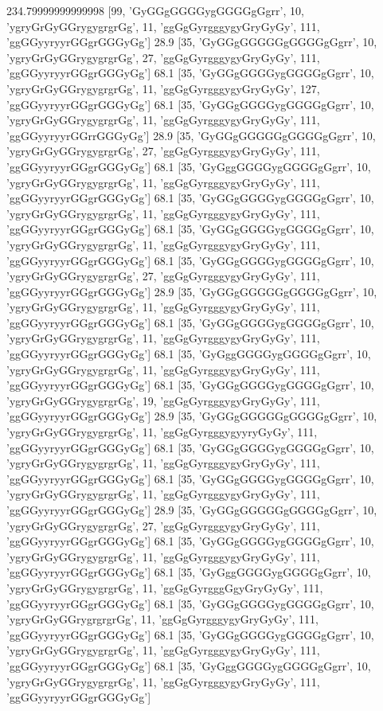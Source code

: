 234.79999999999998 [99, 'GyGGgGGGGygGGGGgGgrr', 10, 'ygryGrGyGGrygygrgrGg', 11, 'ggGgGyrgggygyGryGyGy', 111, 'ggGGyyryyrGGgrGGGyGg']
28.9 [35, 'GyGGgGGGGGgGGGGgGgrr', 10, 'ygryGrGyGGrygygrgrGg', 27, 'ggGgGyrgggygyGryGyGy', 111, 'ggGGyyryyrGGgrGGGyGg']
68.1 [35, 'GyGGgGGGGygGGGGgGgrr', 10, 'ygryGrGyGGrygygrgrGg', 11, 'ggGgGyrgggygyGryGyGy', 127, 'ggGGyyryyrGGgrGGGyGg']
68.1 [35, 'GyGGgGGGGygGGGGgGgrr', 10, 'ygryGrGyGGrygygrgrGg', 11, 'ggGgGyrgggygyGryGyGy', 111, 'ggGGyyryyrGGrrGGGyGg']
28.9 [35, 'GyGGgGGGGGgGGGGgGgrr', 10, 'ygryGrGyGGrygygrgrGg', 27, 'ggGgGyrgggygyGryGyGy', 111, 'ggGGyyryyrGGgrGGGyGg']
68.1 [35, 'GyGggGGGGygGGGGgGgrr', 10, 'ygryGrGyGGrygygrgrGg', 11, 'ggGgGyrgggygyGryGyGy', 111, 'ggGGyyryyrGGgrGGGyGg']
68.1 [35, 'GyGGgGGGGygGGGGgGgrr', 10, 'ygryGrGyGGrygygrgrGg', 11, 'ggGgGyrgggygyGryGyGy', 111, 'ggGGyyryyrGGgrGGGyGg']
68.1 [35, 'GyGGgGGGGygGGGGgGgrr', 10, 'ygryGrGyGGrygygrgrGg', 11, 'ggGgGyrgggygyGryGyGy', 111, 'ggGGyyryyrGGgrGGGyGg']
68.1 [35, 'GyGGgGGGGygGGGGgGgrr', 10, 'ygryGrGyGGrygygrgrGg', 27, 'ggGgGyrgggygyGryGyGy', 111, 'ggGGyyryyrGGgrGGGyGg']
28.9 [35, 'GyGGgGGGGGgGGGGgGgrr', 10, 'ygryGrGyGGrygygrgrGg', 11, 'ggGgGyrgggygyGryGyGy', 111, 'ggGGyyryyrGGgrGGGyGg']
68.1 [35, 'GyGGgGGGGygGGGGgGgrr', 10, 'ygryGrGyGGrygygrgrGg', 11, 'ggGgGyrgggygyGryGyGy', 111, 'ggGGyyryyrGGgrGGGyGg']
68.1 [35, 'GyGggGGGGygGGGGgGgrr', 10, 'ygryGrGyGGrygygrgrGg', 11, 'ggGgGyrgggygyGryGyGy', 111, 'ggGGyyryyrGGgrGGGyGg']
68.1 [35, 'GyGGgGGGGygGGGGgGgrr', 10, 'ygryGrGyGGrygygrgrGg', 19, 'ggGgGyrgggygyGryGyGy', 111, 'ggGGyyryyrGGgrGGGyGg']
28.9 [35, 'GyGGgGGGGGgGGGGgGgrr', 10, 'ygryGrGyGGrygygrgrGg', 11, 'ggGgGyrgggygyyryGyGy', 111, 'ggGGyyryyrGGgrGGGyGg']
68.1 [35, 'GyGGgGGGGygGGGGgGgrr', 10, 'ygryGrGyGGrygygrgrGg', 11, 'ggGgGyrgggygyGryGyGy', 111, 'ggGGyyryyrGGgrGGGyGg']
68.1 [35, 'GyGGgGGGGygGGGGgGgrr', 10, 'ygryGrGyGGrygygrgrGg', 11, 'ggGgGyrgggygyGryGyGy', 111, 'ggGGyyryyrGGgrGGGyGg']
28.9 [35, 'GyGGgGGGGGgGGGGgGgrr', 10, 'ygryGrGyGGrygygrgrGg', 27, 'ggGgGyrgggygyGryGyGy', 111, 'ggGGyyryyrGGgrGGGyGg']
68.1 [35, 'GyGGgGGGGygGGGGgGgrr', 10, 'ygryGrGyGGrygygrgrGg', 11, 'ggGgGyrgggygyGryGyGy', 111, 'ggGGyyryyrGGgrGGGyGg']
68.1 [35, 'GyGggGGGGygGGGGgGgrr', 10, 'ygryGrGyGGrygygrgrGg', 11, 'ggGgGyrgggGgyGryGyGy', 111, 'ggGGyyryyrGGgrGGGyGg']
68.1 [35, 'GyGGgGGGGygGGGGgGgrr', 10, 'ygryGrGyGGrygrgrgrGg', 11, 'ggGgGyrgggygyGryGyGy', 111, 'ggGGyyryyrGGgrGGGyGg']
68.1 [35, 'GyGGgGGGGygGGGGgGgrr', 10, 'ygryGrGyGGrygygrgrGg', 11, 'ggGgGyrgggygyGryGyGy', 111, 'ggGGyyryyrGGgrGGGyGg']
68.1 [35, 'GyGggGGGGygGGGGgGgrr', 10, 'ygryGrGyGGrygygrgrGg', 11, 'ggGgGyrgggygyGryGyGy', 111, 'ggGGyyryyrGGgrGGGyGg']

